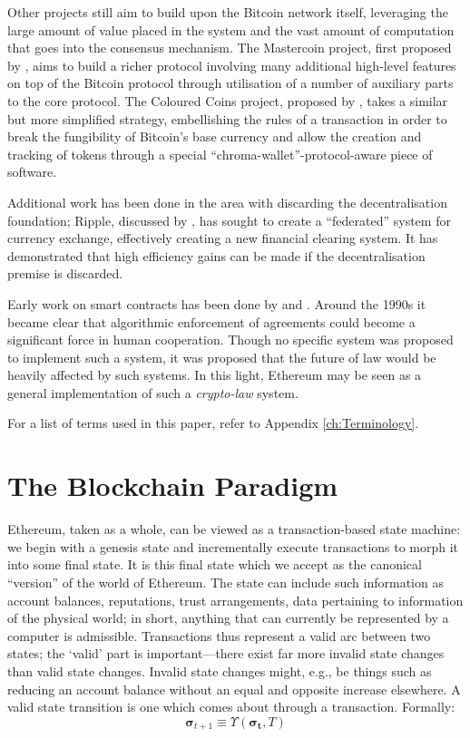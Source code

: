 \documentclass[9pt,oneside]{amsart}
\makeatletter
\newcommand*\eg{e.g.\@\xspace}
\makeatother
\begin{document}
\begin{multicols}{2}
Other projects still aim to build upon the Bitcoin network itself, leveraging the large amount of value placed in the system and the vast amount of computation that goes into the consensus mechanism. The Mastercoin project, first proposed by \cite{mastercoin2013willett}, aims to build a richer protocol involving many additional high-level features on top of the Bitcoin protocol through utilisation of a number of auxiliary parts to the core protocol. The Coloured Coins project, proposed by \cite{colouredcoins2012rosenfeld}, takes a similar but more simplified strategy, embellishing the rules of a transaction in order to break the fungibility of Bitcoin's base currency and allow the creation and tracking of tokens through a special ``chroma-wallet''-protocol-aware piece of software.

Additional work has been done in the area with discarding the decentralisation foundation; Ripple, discussed by \cite{boutellier2014pirates}, has sought to create a ``federated'' system for currency exchange, effectively creating a new financial clearing system. It has demonstrated that high efficiency gains can be made if the decentralisation premise is discarded.

Early work on smart contracts has been done by \cite{szabo1997formalizing} and \cite{miller1997future}. Around the 1990s it became clear that algorithmic enforcement of agreements could become a significant force in human cooperation. Though no specific system was proposed to implement such a system, it was proposed that the future of law would be heavily affected by such systems. In this light, Ethereum may be seen as a general implementation of such a \textit{crypto-law} system.


For a list of terms used in this paper, refer to Appendix \ref{ch:Terminology}.

\section{The Blockchain Paradigm} \label{ch:overview}

Ethereum, taken as a whole, can be viewed as a transaction-based state machine: we begin with a genesis state and incrementally execute transactions to morph it into some final state. It is this final state which we accept as the canonical ``version'' of the world of Ethereum. The state can include such information as account balances, reputations, trust arrangements, data pertaining to information of the physical world; in short, anything that can currently be represented by a computer is admissible. Transactions thus represent a valid arc between two states; the `valid' part is important---there exist far more invalid state changes than valid state changes. Invalid state changes might, \eg, be things such as reducing an account balance without an equal and opposite increase elsewhere. A valid state transition is one which comes about through a transaction. Formally:\hypertarget{Upsilon}{}
\begin{equation}
\boldsymbol{\sigma}_{t+1} \equiv \Upsilon(\boldsymbol{\sigma}_\mathbf{t}, T)
\end{equation}


\end{multicols}
\end{document}

